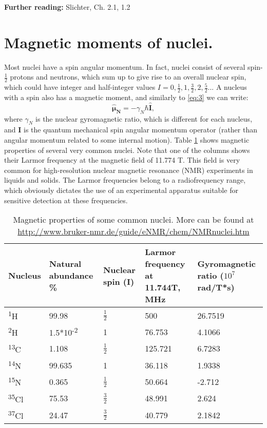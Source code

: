 \documentclass[a4paper, 12pt]{article}
\begin{document}
\textbf{Further reading:} Slichter, Ch. 2.1, 1.2 

\section{Magnetic moments of nuclei.}
Most nuclei have a spin angular momentum. In fact, nuclei consist of several spin-$\frac{1}{2}$ protons and neutrons, which sum up to give rise to an overall nuclear spin, which could have integer and half-integer values $I=0, \frac{1}{2}, 1, \frac{3}{2}, 2, \frac{5}{2}...$ A nucleus with a spin also has a magnetic moment, and similarly to \ref{eq:3} we can write:
\begin{equation}
\bm{\hat{\mu}_N} = -\gamma_N \hbar \bm{\hat{I}},
\end{equation}
where $\gamma_N$ is the nuclear gyromagnetic ratio, which is different for each nucleus, and $\bm{I}$ is the quantum mechanical spin angular momentum operator (rather than angular momentum related to some internal motion). Table \ref{tab:mag_properties} shows magnetic properties of several very common nuclei. Note that one of the columns shows their Larmor frequency at the magnetic field of 11.774 T. This field is very common for high-resolution nuclear magnetic resonance (NMR) experiments in liquids and solids. The Larmor frequencies belong to a radiofrequency range, which obviously dictates the use of an experimental apparatus suitable for sensitive detection at these frequencies. 

\begin{table}[ht]
\caption{Magnetic properties of some common nuclei. More can be found at \url{http://www.bruker-nmr.de/guide/eNMR/chem/NMRnuclei.htm} }
\label{tab:mag_properties}
\centering
\begin{tabular}{m{1.5cm} m{1.5cm} m{1.5cm} m{3cm} m{3cm}}
\hline\hline
Nucleus & Natural abundance \% & Nuclear spin (I) & Larmor frequency at 11.744T, MHz & Gyromagnetic ratio ($10^7$ rad/T*s) \\
\hline
\textsuperscript{1}H & 99.98 & $\frac{1}{2}$ & 500 & 26.7519 \\
\textsuperscript{2}H & 1.5*10\textsuperscript{-2} & 1 & 76.753 & 4.1066 \\
\textsuperscript{13}C & 1.108 & $\frac{1}{2}$ & 125.721 & 6.7283 \\
\textsuperscript{14}N & 99.635 & 1 & 36.118 & 1.9338 \\
\textsuperscript{15}N & 0.365 &  $\frac{1}{2}$ & 50.664 & -2.712 \\
\textsuperscript{35}Cl & 75.53 &  $\frac{3}{2}$ & 48.991 & 2.624 \\
\textsuperscript{37}Cl & 24.47 &  $\frac{3}{2}$ & 40.779 & 2.1842 \\
\hline
\end{tabular}
\end{table}
\end{document}

